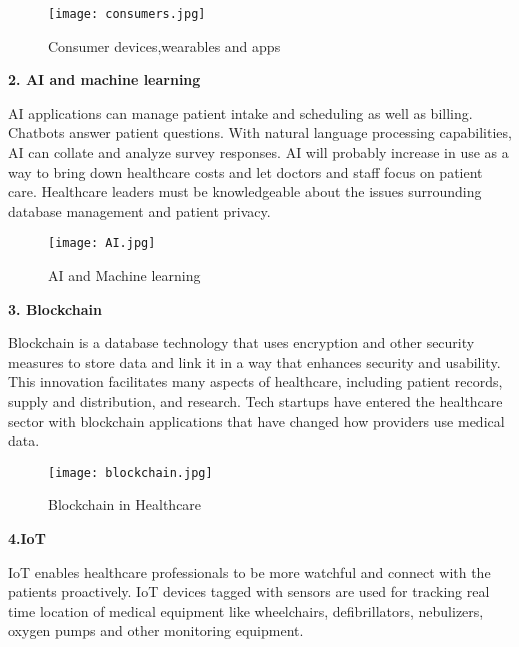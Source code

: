 \documentclass[12pt,a4paper]{article}
\begin{document}
\hspace{5cm}

\begin{figure}[h]
\centering
\texttt{[image: consumers.jpg]}
\caption{Consumer devices,wearables and apps}
\end{figure}



\clearpage




\textbf{2. AI and machine learning}

\hspace{1cm}

            
AI applications can manage patient intake and scheduling as well as billing. Chatbots answer patient questions. With natural language processing capabilities, AI can collate and analyze survey responses. AI will probably increase in use as a way to bring down healthcare costs and let doctors and staff focus on patient care. Healthcare leaders must be knowledgeable about the issues surrounding database management and patient privacy. 

\hspace{5cm}

\begin{figure}[h]
\centering
\texttt{[image: AI.jpg]}
\caption{AI and Machine learning}
\end{figure}



\textbf{3. Blockchain}

\hspace{1cm}
           
Blockchain is a database technology that uses encryption and other security measures to store data and link it in a way that enhances security and usability. This innovation facilitates many aspects of healthcare, including patient records, supply and distribution, and research. Tech startups have entered the healthcare sector with blockchain applications that have changed how providers use medical data. 

\begin{figure}[h]
\centering
\texttt{[image: blockchain.jpg]}
\caption{Blockchain in Healthcare}
\end{figure}


\clearpage

\textbf{4.IoT}

\hspace{1cm}

 IoT enables healthcare professionals to be more watchful and connect with the patients proactively.  IoT devices tagged with sensors are used for tracking real time location of medical equipment like wheelchairs, defibrillators, nebulizers, oxygen pumps and other monitoring equipment. 
 
\end{document}
